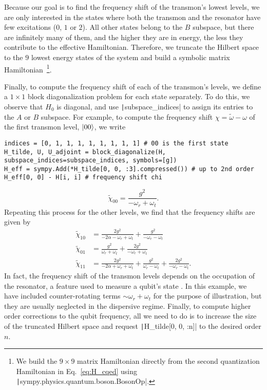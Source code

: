 Because our goal is to find the frequency shift of the transmon's lowest
levels, we are only interested in the states where both the transmon and the
resonator have few excitations ($0$, $1$ or $2$).
All other states belong to the $B$ subspace, but there are infinitely many of
them, and the higher they are in energy, the less they contribute to the
effective Hamiltonian.
Therefore, we truncate the Hilbert space to the $9$ lowest energy states of
the system and build a symbolic matrix Hamiltonian~\footnote{We build the $9
\times 9$ matrix Hamiltonian directly from the second quantization Hamiltonian
in Eq.~\eqref{eq:H_cqed} using
\texttt|sympy.physics.quantum.boson.BosonOp|.}.

Finally, to compute the frequency shift of each of the transmon's levels, we
define a $1 \times 1$ block diagonalization problem for each state separately.
To do this, we observe that $H_0$ is diagonal, and use
\texttt|subspace_indices| to assign its entries to the $A$ or $B$
subspace.
For example, to compute the frequency shift $\chi = \tilde{\omega} - \omega$ of
the first transmon level, $\ket{00}$, we write
%
\begin{verbatim}
indices = [0, 1, 1, 1, 1, 1, 1, 1, 1] # 00 is the first state
H_tilde, U, U_adjoint = block_diagonalize(H, subspace_indices=subspace_indices, symbols=[g])
H_eff = sympy.Add(*H_tilde[0, 0, :3].compressed()) # up to 2nd order
H_eff[0, 0] - H[i, i] # frequency shift chi
\end{verbatim}
%
\begin{equation}
    \tilde{\chi}_{00} = \frac{g^{2}}{- \omega_{r} + \omega_{t}}.
\end{equation}
%
Repeating this process for the other levels, we find that the frequency shifts
are given by
%
\begin{align}
    \tilde{\chi}_{10} &= \frac{2 g^{2}}{- 2 \alpha - \omega_{r} + \omega_{t}} + \frac{g^{2}}{- \omega_{r} - \omega_{t}} \\
    \tilde{\chi}_{01} &= \frac{g^{2}}{\omega_{r} + \omega_{t}} + \frac{2 g^{2}}{- \omega_{r} + \omega_{t}} \\
    \tilde{\chi}_{11} &= \frac{2 g^{2}}{- 2 \alpha + \omega_{r} + \omega_{t}} + \frac{g^{2}}{\omega_{r} - \omega_{t}} + \frac{2 g^{2}}{- \omega_{r} - \omega_{t}}.
\end{align}
In fact, the frequency shift of the transmon levels depends on the occupation
of the resonator, a feature used to measure a qubit's state \cite{Blais_2004}.
In this example, we have included counter-rotating terms $\sim \omega_{r} +
\omega_{t}$ for the purpose of illustration, but they are usually neglected in
the dispersive regime.
Finally, to compute higher order corrections to the qubit frequency, all we need
to do is to increase the size of the truncated Hilbert space and request
\texttt|H_tilde[0, 0, :n]| to the desired order $n$.

